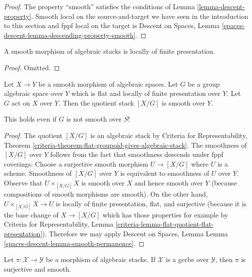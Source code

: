 \begin{proof}
The property ``smooth''
satisfies the conditions of Lemma \ref{lemma-descent-property}.
Smooth local on the source-and-target we have seen in the
introduction to this section and fppf local on the target is
Descent on Spaces, Lemma
\ref{spaces-descent-lemma-descending-property-smooth}.
\end{proof}

\begin{lemma}
\label{lemma-smooth-locally-finite-presentation}
A smooth morphism of algebraic stacks is locally of finite presentation.
\end{lemma}

\begin{proof}
Omitted.
\end{proof}

\begin{lemma}
\label{lemma-smooth-quotient-stack}
Let $X \to Y$ be a smooth morphism of algebraic spaces.
Let $G$ be a group algebraic space over $Y$ which is flat
and locally of finite presentation over $Y$. Let $G$ act on $X$ over $Y$.
Then the quotient stack $[X/G]$ is smooth over $Y$.
\end{lemma}

\noindent
This holds even if $G$ is not smooth over $S$!

\begin{proof}
The quotient $[X/G]$ is an algebraic stack by
Criteria for Representability, Theorem
\ref{criteria-theorem-flat-groupoid-gives-algebraic-stack}.
The smoothness of $[X/G]$ over $Y$ follows from the fact that smoothness
descends under fppf coverings:
Choose a surjective smooth morphism $U \to [X/G]$ where $U$ is a scheme.
Smoothness of $[X/G]$ over $Y$ is equivalent to smoothness of $U$ over $Y$.
Observe that $U \times_{[X/G]} X$ is smooth over $X$ and hence smooth
over $Y$ (because compositions of smooth morphisms are smooth).
On the other hand, $U \times_{[X/G]} X \to U$ is locally of
finite presentation, flat, and surjective (because it is
the base change of $X \to [X/G]$ which has those properties
for example by Criteria for Representability, Lemma
\ref{criteria-lemma-flat-quotient-flat-presentation}).
Therefore we may apply Descent on Spaces, Lemma
Lemma \ref{spaces-descent-lemma-smooth-permanence}.
\end{proof}

\begin{lemma}
\label{lemma-gerbe-smooth}
Let $\pi : \mathcal{X} \to \mathcal{Y}$ be a morphism of algebraic stacks.
If $\mathcal{X}$ is a gerbe over $\mathcal{Y}$, then $\pi$ is surjective
and smooth.
\end{lemma}

